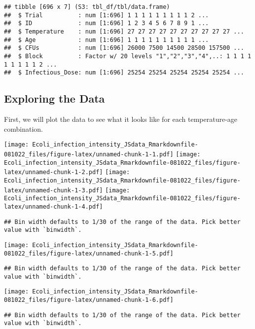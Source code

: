 \documentclass[
]{article}
\begin{document}
\begin{verbatim}
## tibble [696 x 7] (S3: tbl_df/tbl/data.frame)
##  $ Trial          : num [1:696] 1 1 1 1 1 1 1 1 1 2 ...
##  $ ID             : num [1:696] 1 2 3 4 5 6 7 8 9 1 ...
##  $ Temperature    : num [1:696] 27 27 27 27 27 27 27 27 27 27 ...
##  $ Age            : num [1:696] 1 1 1 1 1 1 1 1 1 1 ...
##  $ CFUs           : num [1:696] 26000 7500 14500 28500 157500 ...
##  $ Block          : Factor w/ 20 levels "1","2","3","4",..: 1 1 1 1 1 1 1 1 1 2 ...
##  $ Infectious_Dose: num [1:696] 25254 25254 25254 25254 25254 ...
\end{verbatim}

\hypertarget{exploring-the-data}{%
\subsection{Exploring the Data}\label{exploring-the-data}}

First, we will plot the data to see what it looks like for each
temperature-age combination.

\texttt{[image: Ecoli\_infection\_intensity\_JSdata\_Rmarkdownfile-081022\_files/figure-latex/unnamed-chunk-1-1.pdf]}
\texttt{[image: Ecoli\_infection\_intensity\_JSdata\_Rmarkdownfile-081022\_files/figure-latex/unnamed-chunk-1-2.pdf]}
\texttt{[image: Ecoli\_infection\_intensity\_JSdata\_Rmarkdownfile-081022\_files/figure-latex/unnamed-chunk-1-3.pdf]}
\texttt{[image: Ecoli\_infection\_intensity\_JSdata\_Rmarkdownfile-081022\_files/figure-latex/unnamed-chunk-1-4.pdf]}

\begin{verbatim}
## Bin width defaults to 1/30 of the range of the data. Pick better value with `binwidth`.
\end{verbatim}

\texttt{[image: Ecoli\_infection\_intensity\_JSdata\_Rmarkdownfile-081022\_files/figure-latex/unnamed-chunk-1-5.pdf]}

\begin{verbatim}
## Bin width defaults to 1/30 of the range of the data. Pick better value with `binwidth`.
\end{verbatim}

\texttt{[image: Ecoli\_infection\_intensity\_JSdata\_Rmarkdownfile-081022\_files/figure-latex/unnamed-chunk-1-6.pdf]}

\begin{verbatim}
## Bin width defaults to 1/30 of the range of the data. Pick better value with `binwidth`.
\end{verbatim}
\end{document}
